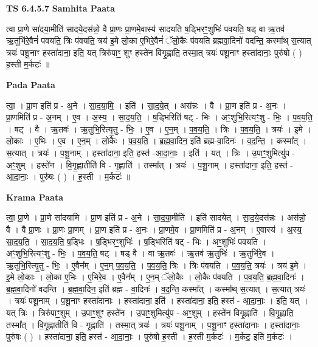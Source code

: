 \documentclass[17pt]{extarticle}
\begin{document}
\textbf{TS 6.4.5.7 } \newline
\textbf{Samhita Paata} \newline

त्वा प्रा॒णे सा॑दया॒मीति॑ सादये॒दस॑न्नो॒ वै प्रा॒णः प्रा॒णमे॒वास्य॑ सादयति ष॒ड्भिरꣳ॒॒शुभिः॑ पवयति॒ षड् वा ऋ॒तव॑ ऋ॒तुभि॑रे॒वैनं॑ पवयति॒ त्रिः प॑वयति॒ त्रय॑ इ॒मे लो॒का ए॒भिरे॒वैनं॑ ॅलो॒कैः प॑वयति ब्रह्मवा॒दिनो॑ वदन्ति॒ कस्मा᳚थ् स॒त्यात् त्रयः॑ पशू॒नाꣳ हस्ता॑दाना॒ इति॒ यत् त्रिरु॑पाꣳ॒॒ शुꣳ हस्ते॑न विगृ॒ह्णाति॒ तस्मा॒त् त्रयः॑ पशू॒नाꣳ हस्ता॑दानाः॒ पुरु॑षो ( ) ह॒स्ती म॒र्कटः॑ ॥ \newline

\textbf{Pada Paata} \newline

त्वा॒ । प्रा॒ण इति॑ प्र - अ॒ने । सा॒द॒या॒मि॒ । इति॑ । सा॒द॒ये॒त् । अस॑न्नः । वै । प्रा॒ण इति॑ प्र - अ॒नः । प्रा॒णमिति॑ प्र - अ॒नम् । ए॒व । अ॒स्य॒ । सा॒द॒य॒ति॒ । ष॒ड्भिरिति॑ षट् - भिः । अꣳ॒॒शुभि॒रित्यꣳ॒॒शु - भिः॒ । प॒व॒य॒ति॒ । षट् । वै । ऋ॒तवः॑ । ऋ॒तुभि॒रित्यृ॒तु - भिः॒ । ए॒व । ए॒न॒म् । प॒व॒य॒ति॒ । त्रिः । प॒व॒य॒ति॒ । त्रयः॑ । इ॒मे । लो॒काः । ए॒भिः । ए॒व । ए॒न॒म् । लो॒कैः । प॒व॒य॒ति॒ । ब्र॒ह्म॒वा॒दिन॒ इति॑ ब्रह्म-वा॒दिनः॑ । व॒द॒न्ति॒ । कस्मा᳚त् । स॒त्यात् । त्रयः॑ । प॒शू॒नाम् । हस्ता॑दाना॒ इति॒ हस्त॑ -आ॒दा॒नाः॒ । इति॑ । यत् । त्रिः । उ॒पाꣳ॒॒शुमित्यु॑प - अꣳ॒॒शुम् । हस्ते॑न । वि॒गृ॒ह्णातीति॑ वि - गृ॒ह्णाति॑ । तस्मा᳚त् । त्रयः॑ । प॒शू॒नाम् । हस्ता॑दाना॒ इति॒ हस्त॑ - आ॒दा॒नाः॒ । पुरु॑षः ( ) । ह॒स्ती । म॒र्कटः॑ ॥  \newline


\textbf{Krama Paata} \newline

त्वा॒ प्रा॒णे । प्रा॒णे सा॑दयामि । प्रा॒ण इति॑ प्र - अ॒ने । सा॒द॒या॒मीति॑ । इति॑ सादयेत् । सा॒द॒ये॒दस॑न्नः । अस॑न्नो॒ वै । वै प्रा॒णः । प्रा॒णः प्रा॒णम् । प्रा॒ण इति॑ प्र - अ॒नः । प्रा॒णमे॒व । प्रा॒णमिति॑ प्र - अ॒नम् । ए॒वास्य॑ । अ॒स्य॒ सा॒द॒य॒ति॒ । सा॒द॒य॒ति॒ ष॒ड्भिः । ष॒ड्भिरꣳ॒॒शुभिः॑ । ष॒ड्भिरिति॑ षट् - भिः । अꣳ॒॒शुभिः॑ पवयति । अꣳ॒॒शुभि॒रित्यꣳ॒॒शु - भिः॒ । प॒व॒य॒ति॒ षट् । षड् वै । वा ऋ॒तवः॑ । ऋ॒तव॑ ऋ॒तुभिः॑ । ऋ॒तुभि॑रे॒व । ऋ॒तुभि॒रित्यृ॒तु - भिः॒ । ए॒वैन᳚म् । ए॒न॒म् प॒व॒य॒ति॒ । प॒व॒य॒ति॒ त्रिः । त्रिः प॑वयति । प॒व॒य॒ति॒ त्रयः॑ । त्रय॑ इ॒मे । इ॒मे लो॒काः । लो॒का ए॒भिः । ए॒भिरे॒व । ए॒वैन᳚म् । ए॒न॒म् ॅलो॒कैः । लो॒कैः प॑वयति । प॒व॒य॒ति॒ ब्र॒ह्म॒वा॒दिनः॑ । ब्र॒ह्म॒वा॒दिनो॑ वदन्ति । ब्र॒ह्म॒वा॒दिन॒ इति॑ ब्रह्म - वा॒दिनः॑ । व॒द॒न्ति॒ कस्मा᳚त् । कस्मा᳚थ् स॒त्यात् । स॒त्यात् त्रयः॑ । त्रयः॑ पशू॒नाम् । प॒शू॒नाꣳ हस्ता॑दानाः । हस्ता॑दाना॒ इति॑ । हस्ता॑दाना॒ इति॒ हस्त॑ - आ॒दा॒नाः॒ । इति॒ यत् । यत् त्रिः । त्रिरु॑पाꣳ॒॒शुम् । उ॒पाꣳ॒॒शुꣳ हस्ते॑न । उ॒पाꣳ॒॒शुमित्यु॑प - अꣳ॒॒शुम् । हस्ते॑न विगृ॒ह्णाति॑ । वि॒गृ॒ह्णाति॒ तस्मा᳚त् । वि॒गृ॒ह्णातीति॑ वि - गृ॒ह्णाति॑ । तस्मा॒त् त्रयः॑ । त्रयः॑ पशू॒नाम् । प॒शू॒नाꣳ हस्ता॑दानाः । हस्ता॑दानाः॒ पुरु॑षः ( ) । हस्ता॑दाना॒ इति॒ हस्त॑ - आ॒दा॒नाः॒ । पुरु॑षो ह॒स्ती । ह॒स्ती म॒र्कटः॑ । म॒र्कट॒ इति॑ म॒र्कटः॑ । \newline
\end{document}
